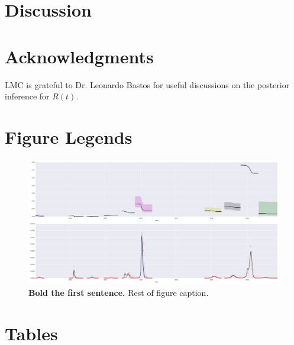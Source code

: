 \section*{Discussion}
\section*{Acknowledgments}
LMC is grateful to Dr. Leonardo Bastos for useful discussions on the 
posterior inference for $R(t)$.


\section*{Figure Legends}
%
\begin{figure}
\begin{center}
\includegraphics[width=.9\textwidth]{./plots/concat_SI.png}
\end{center}
\caption{
{\bf Bold the first sentence.}  Rest of figure caption.  
}
\label{Fig:S0}
\end{figure}



\section*{Tables}
% 
%
%

